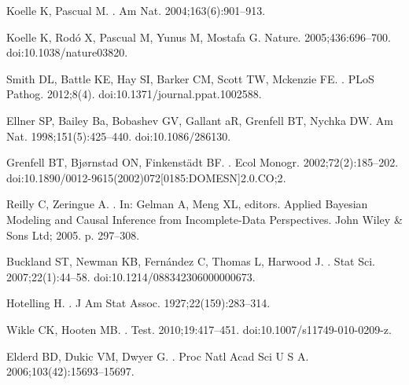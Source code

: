 \documentclass[10pt,letterpaper]{article}
\begin{document}
\begin{thebibliography}{10}
Koelle K, Pascual M.
.
\newblock Am Nat. 2004;163(6):901--913.

Koelle K, Rod{\'{o}} X, Pascual M, Yunus M, Mostafa G.
\newblock Nature. 2005;436:696--700.
\newblock doi:{10.1038/nature03820}.

Smith DL, Battle KE, Hay SI, Barker CM, Scott TW, Mckenzie FE.
.
\newblock PLoS Pathog. 2012;8(4).
\newblock doi:{10.1371/journal.ppat.1002588}.

Ellner SP, Bailey Ba, Bobashev GV, Gallant aR, Grenfell BT, Nychka DW.
\newblock Am Nat. 1998;151(5):425--440.
\newblock doi:{10.1086/286130}.

Grenfell BT, Bj{\o}rnstad ON, Finkenst{\"{a}}dt BF.
.
\newblock Ecol Monogr. 2002;72(2):185--202.
\newblock doi:{10.1890/0012-9615(2002)072[0185:DOMESN]2.0.CO;2}.

Reilly C, Zeringue A.
.
\newblock In: Gelman A, Meng XL, editors. Applied Bayesian Modeling and Causal
  Inference from Incomplete-Data Perspectives. John Wiley {\&} Sons Ltd; 2005.
  p. 297--308.

Buckland ST, Newman KB, Fern{\'{a}}ndez C, Thomas L, Harwood J.
.
\newblock Stat Sci. 2007;22(1):44--58.
\newblock doi:{10.1214/088342306000000673}.

Hotelling H.
.
\newblock J Am Stat Assoc. 1927;22(159):283--314.

Wikle CK, Hooten MB.
.
\newblock Test. 2010;19:417--451.
\newblock doi:{10.1007/s11749-010-0209-z}.

Elderd BD, Dukic VM, Dwyer G.
.
\newblock Proc Natl Acad Sci U S A. 2006;103(42):15693--15697.


\end{thebibliography}
\end{document}
